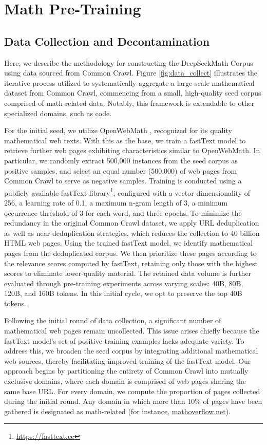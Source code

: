 \section{Math Pre-Training}

\subsection{Data Collection and Decontamination} 
Here, we describe the methodology for constructing the DeepSeekMath Corpus using data sourced from Common Crawl. Figure \ref{fig:data_collect} illustrates the iterative process utilized to systematically aggregate a large-scale mathematical dataset from Common Crawl, commencing from a small, high-quality seed corpus comprised of math-related data. Notably, this framework is extendable to other specialized domains, such as code.

For the initial seed, we utilize OpenWebMath \citep{openwebmath}, recognized for its quality mathematical web texts. With this as the base, we train a fastText model \citep{joulin2016fasttext} to retrieve further web pages exhibiting characteristics similar to OpenWebMath. In particular, we randomly extract 500,000 instances from the seed corpus as positive samples, and select an equal number (500,000) of web pages from Common Crawl to serve as negative samples. Training is conducted using a publicly available fastText library\footnote{\url{https://fasttext.cc}}, configured with a vector dimensionality of 256, a learning rate of 0.1, a maximum n-gram length of 3, a minimum occurrence threshold of 3 for each word, and three epochs. To minimize the redundancy in the original Common Crawl dataset, we apply URL deduplication as well as near-deduplication strategies, which reduces the collection to 40 billion HTML web pages. Using the trained fastText model, we identify mathematical pages from the deduplicated corpus. We then prioritize these pages according to the relevance scores computed by fastText, retaining only those with the highest scores to eliminate lower-quality material. The retained data volume is further evaluated through pre-training experiments across varying scales: 40B, 80B, 120B, and 160B tokens. In this initial cycle, we opt to preserve the top 40B tokens.

Following the initial round of data collection, a significant number of mathematical web pages remain uncollected. This issue arises chiefly because the fastText model’s set of positive training examples lacks adequate variety. To address this, we broaden the seed corpus by integrating additional mathematical web sources, thereby facilitating improved training of the fastText model. Our approach begins by partitioning the entirety of Common Crawl into mutually exclusive domains, where each domain is comprised of web pages sharing the same base URL. For every domain, we compute the proportion of pages collected during the initial round. Any domain in which more than 10\% of pages have been gathered is designated as math-related (for instance, \url{mathoverflow.net}).

